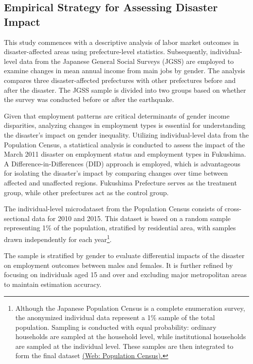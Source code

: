 \documentclass[a4paper,12pt]{article}
\begin{document}

\subsection{Empirical Strategy for Assessing Disaster Impact}

This study commences with a descriptive analysis of labor market outcomes in disaster-affected areas using prefecture-level statistics. Subsequently, individual-level data from the Japanese General Social Surveys (JGSS) are employed to examine changes in mean annual income from main jobs by gender. The analysis compares three disaster-affected prefectures with other prefectures before and after the disaster. The JGSS sample is divided into two groups based on whether the survey was conducted before or after the earthquake.

Given that employment patterns are critical determinants of gender income disparities, analyzing changes in employment types is essential for understanding the disaster's impact on gender inequality. Utilizing individual-level data from the Population Census, a statistical analysis is conducted to assess the impact of the March 2011 disaster on employment status and employment types in Fukushima. A Difference-in-Differences (DID) approach is employed, which is advantageous for isolating the disaster's impact by comparing changes over time between affected and unaffected regions. Fukushima Prefecture serves as the treatment group, while other prefectures act as the control group.

The individual-level microdataset from the Population Census consists of cross-sectional data for 2010 and 2015. This dataset is based on a random sample representing 1\% of the population, stratified by residential area, with samples drawn independently for each year\footnote{Although the Japanese Population Census is a complete enumeration survey, the anonymized individual data represent a 1\% sample of the total population. Sampling is conducted with equal probability: ordinary households are sampled at the household level, while institutional households are sampled at the individual level. These samples are then integrated to form the final dataset \href{https://www.stat.go.jp/english/data/kokusei/index.html}{(Web: Population Census).}}.

The sample is stratified by gender to evaluate differential impacts of the disaster on employment outcomes between males and females. It is further refined by focusing on individuals aged 15 and over and excluding major metropolitan areas to maintain estimation accuracy.
\end{document}
